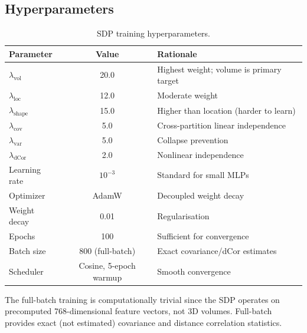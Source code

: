 \subsection{Hyperparameters}
\label{sec:sdp:hyperparams}

\begin{table}[H]
  \centering
  \caption{SDP training hyperparameters.}
  \label{tab:sdp_hyperparams}
  \begin{tabular}{lcp{6cm}}
    \toprule
    \textbf{Parameter} & \textbf{Value} & \textbf{Rationale} \\
    \midrule
    $\lambda_{\text{vol}}$ & 20.0 & Highest weight; volume is primary target \\
    $\lambda_{\text{loc}}$ & 12.0 & Moderate weight \\
    $\lambda_{\text{shape}}$ & 15.0 & Higher than location (harder to learn) \\
    $\lambda_{\text{cov}}$ & 5.0 & Cross-partition linear independence \\
    $\lambda_{\text{var}}$ & 5.0 & Collapse prevention \\
    $\lambda_{\text{dCor}}$ & 2.0 & Nonlinear independence \\
    Learning rate & $10^{-3}$ & Standard for small MLPs \\
    Optimizer & AdamW & Decoupled weight decay \\
    Weight decay & 0.01 & Regularisation \\
    Epochs & 100 & Sufficient for convergence \\
    Batch size & 800 (full-batch) & Exact covariance/dCor estimates \\
    Scheduler & Cosine, 5-epoch warmup & Smooth convergence \\
    \bottomrule
  \end{tabular}
\end{table}

The full-batch training is computationally trivial since the SDP operates on
precomputed 768-dimensional feature vectors, not 3D volumes. Full-batch
provides exact (not estimated) covariance and distance correlation statistics.

